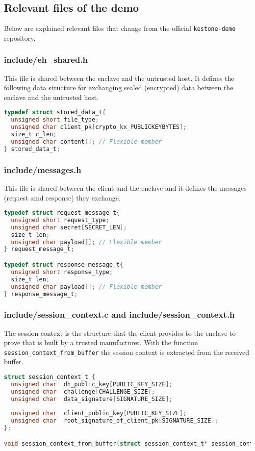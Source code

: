 \subsection*{Relevant files of the demo}
Below are explained relevant files that change from the official \texttt{kestone-demo} repository.

\subsubsection{include/eh\_shared.h}
This file is shared between the enclave and the untrusted host. It defines the following data structure for exchanging sealed (encrypted) data between the enclave and the untrusted host. 

\begin{lstlisting}[language=C,frame=single]
typedef struct stored_data_t{
  unsigned short file_type;
  unsigned char client_pk[crypto_kx_PUBLICKEYBYTES];
  size_t c_len;  
  unsigned char content[]; // Flexible member
} stored_data_t;      
\end{lstlisting}

\subsubsection{include/messages.h}
This file is shared between the client and the enclave and it defines the messages (request amd response) they exchange. 
\begin{lstlisting}[language=C,frame=single]
typedef struct request_message_t{
  unsigned short request_type;
  unsigned char secret[SECRET_LEN];
  size_t len;
  unsigned char payload[]; // Flexible member
} request_message_t;

typedef struct response_message_t{
  unsigned short response_type;
  size_t len;
  unsigned char payload[]; // Flexible member
} response_message_t;
\end{lstlisting}


\subsubsection{include/session\_context.c and include/session\_context.h}
The session context is the structure that the client provides to the enclave to prove that is built by a trusted manufacturer. With the function \texttt{session\_context\_from\_buffer} the session context is extracted from the received buffer. 
\begin{lstlisting}[language=C,frame=single]
struct session_context_t {
  unsigned char  dh_public_key[PUBLIC_KEY_SIZE];
  unsigned char  challenge[CHALLENGE_SIZE];
  unsigned char  data_signature[SIGNATURE_SIZE];
  
  unsigned char  client_public_key[PUBLIC_KEY_SIZE];
  unsigned char  root_signature_of_client_pk[SIGNATURE_SIZE];
};

void session_context_from_buffer(struct session_context_t* session_context, unsigned char* buffer);
\end{lstlisting}

